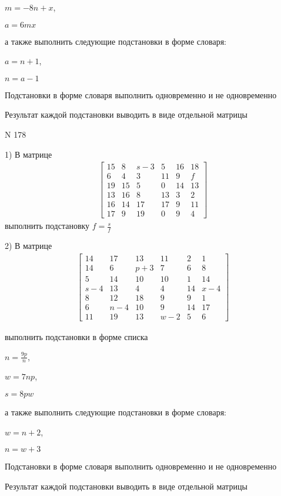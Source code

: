 \documentclass[11pt]{report}
\begin{document}
$m=- 8 n + x$,

$a=6 m x$

а также выполнить следующие подстановки в форме словаря:

$a=n + 1$,

$n=a - 1$


    Подстановки в форме словаря выполнить одновременно и не одновременно


    Результат каждой подстановки выводить в виде отдельной матрицы

\newpage
N 178


    1) В матрице
\begin{align*}
\left[\begin{matrix}15 & 8 & s - 3 & 5 & 16 & 18\\6 & 4 & 3 & 11 & 9 & f\\19 & 15 & 5 & 0 & 14 & 13\\13 & 16 & 8 & 13 & 3 & 2\\16 & 14 & 17 & 17 & 9 & 11\\17 & 9 & 19 & 0 & 9 & 4\end{matrix}\right]
\end{align*}
выполнить подстановку $f=\frac{s}{f}$


    2) В матрице
\begin{align*}
\left[\begin{matrix}14 & 17 & 13 & 11 & 2 & 1\\14 & 6 & p + 3 & 7 & 6 & 8\\5 & 14 & 10 & 10 & 1 & 14\\s - 4 & 13 & 4 & 4 & 14 & x - 4\\8 & 12 & 18 & 9 & 9 & 1\\6 & n - 4 & 10 & 9 & 14 & 17\\11 & 19 & 13 & w - 2 & 5 & 6\end{matrix}\right]
\end{align*}

выполнить подстановки в форме списка

$n=\frac{9 p}{n}$,

$w=7 n p$,

$s=8 p w$

а также выполнить следующие подстановки в форме словаря:

$w=n + 2$,

$n=w + 3$


    Подстановки в форме словаря выполнить одновременно и не одновременно


    Результат каждой подстановки выводить в виде отдельной матрицы
\end{document}
